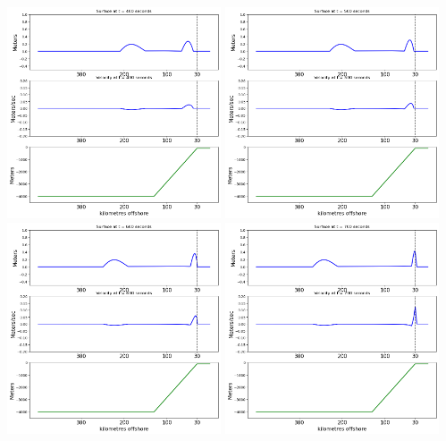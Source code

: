 \documentclass[11pt]{article}
\begin{document}
\vskip 10pt 
\includegraphics[width=0.475\textwidth]{frame0004fig2.png}
\vskip 10pt 
\includegraphics[width=0.475\textwidth]{frame0005fig2.png}
\vskip 10pt 
\includegraphics[width=0.475\textwidth]{frame0006fig2.png}
\vskip 10pt 
\includegraphics[width=0.475\textwidth]{frame0007fig2.png}
\end{document}
